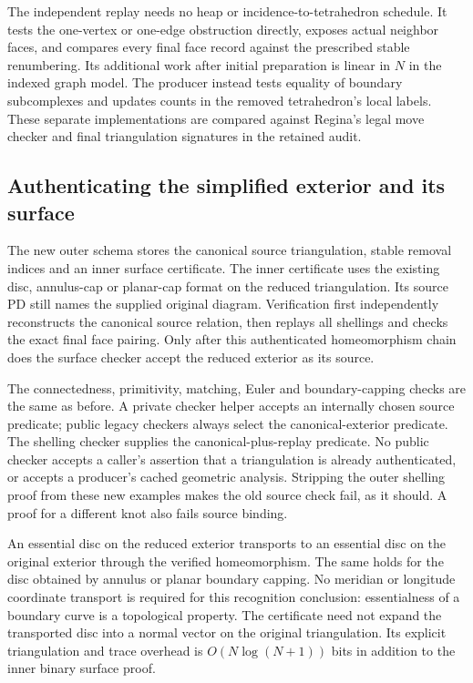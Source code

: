 The independent replay needs no heap or incidence-to-tetrahedron schedule.
It tests the one-vertex or one-edge obstruction directly, exposes actual
neighbor faces, and compares every final face record against the prescribed
stable renumbering. Its additional work after initial preparation is linear
in $N$ in the indexed graph model. The producer instead tests equality of
boundary subcomplexes and updates counts in the removed tetrahedron's local
labels. These separate implementations are compared against Regina's legal
move checker and final triangulation signatures in the retained audit.

\subsection{Authenticating the simplified exterior and its surface}

The new outer schema  stores the canonical
source triangulation, stable removal indices and an inner surface certificate.
The inner certificate uses the existing disc, annulus-cap or planar-cap
format on the reduced triangulation. Its source PD still names the supplied
original diagram. Verification first independently reconstructs the canonical
source relation, then replays all shellings and checks the exact final face
pairing. Only after this authenticated homeomorphism chain does the surface
checker accept the reduced exterior as its source.

The connectedness, primitivity, matching, Euler and boundary-capping checks
are the same as before. A private checker helper accepts an internally chosen
source predicate; public legacy checkers always select the canonical-exterior
predicate. The shelling checker supplies the canonical-plus-replay predicate.
No public checker accepts a caller's assertion that a triangulation is already
authenticated, or accepts a producer's cached geometric analysis. Stripping
the outer shelling proof from these new examples makes the old source check
fail, as it should. A proof for a different knot also fails source binding.

An essential disc on the reduced exterior transports to an essential disc
on the original exterior through the verified homeomorphism. The same holds
for the disc obtained by annulus or planar boundary capping. No meridian or
longitude coordinate transport is required for this recognition conclusion:
essentialness of a boundary curve is a topological property. The certificate
need not expand the transported disc into a normal vector on the original
triangulation. Its explicit triangulation and trace overhead is
$O(N\log(N+1))$ bits in addition to the inner binary surface proof.

